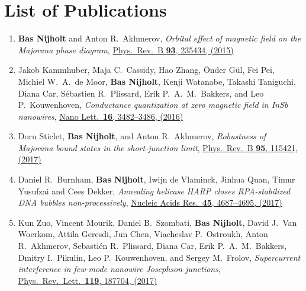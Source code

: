 \chapter*{List of Publications}
\label{publications}

\begin{enumerate}

\item \textbf{Bas Nijholt} and Anton R.~Akhmerov, \textit{Orbital effect of magnetic field on the Majorana phase diagram}, \href{https://doi.org/10.1103/PhysRevB.93.235434}{Phys.~Rev.~B \textbf{93}, 235434, (2015)}

\item Jakob Kammhuber, Maja C.~Cassidy, Hao Zhang, {\"O}nder G{\"u}l, Fei Pei, Michiel W.~A.~de Moor, \textbf{Bas Nijholt}, Kenji Watanabe, Takashi Taniguchi, Diana Car, S{\'e}bastien R.~Plissard, Erik P.~A.~M.~Bakkers, and Leo P.~Kouwenhoven, \textit{Conductance quantization at zero magnetic field in InSb nanowires}, \href{https://doi.org/10.1021/acs.nanolett.6b00051}{Nano Lett.~\textbf{16}, 3482--3486, (2016)}

\item Doru Sticlet, \textbf{Bas Nijholt}, and Anton R.~Akhmerov, \textit{Robustness of Majorana bound states in the short-junction limit}, \href{https://doi.org/10.1103/PhysRevB.95.115421}{Phys.~Rev.~B \textbf{95}, 115421, (2017)}

\item Daniel R.~Burnham, \textbf{Bas Nijholt}, Iwijn de Vlaminck,  Jinhua Quan, Timur Yusufzai and Cees Dekker, \textit{Annealing helicase HARP closes RPA-stabilized DNA bubbles non-processively}, \href{https://doi.org/10.1093/nar/gkx147}{Nucleic Acids Res.~\textbf{45}, 4687--4695, (2017)}

\item Kun Zuo, Vincent Mourik, Daniel B.~Szombati, \textbf{Bas Nijholt}, David J.~Van Woerkom, Attila Geresdi, Jun Chen, Viacheslav P.~Ostroukh, Anton R.~Akhmerov, Sebasti{\'e}n R.~Plissard, Diana Car, Erik P.~A.~M.~Bakkers, Dmitry I.~Pikulin, Leo P.~Kouwenhoven, and Sergey M.~Frolov, \textit{Supercurrent interference in few-mode nanowire Josephson junctions}, \href{https://doi.org/10.1103/PhysRevLett.119.187704}{Phys.~Rev.~Lett.~\textbf{119}, 187704, (2017)}


\end{enumerate}
